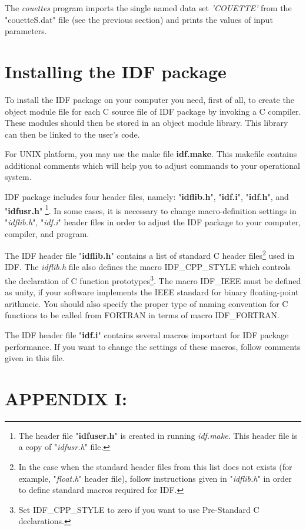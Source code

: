 The {\it couettes} program imports the single named data set
{\it 'COUETTE'} from the "couetteS.dat" file
(see the previous section)
and prints the values of input parameters.

\section{Installing the IDF package}

To install the IDF package on your computer
you need, first of all, 
to create the object module file for each C source file
of IDF package by invoking a C compiler. 
These modules should then be stored in an object module library.
This library can then be linked to the user's code.

For UNIX platform, you may use the make file {\bf idf.make}.
This makefile contains additional comments which will help 
you to adjust commands to your operational system.

IDF package includes four header files, namely:
"{\bf idflib.h}", "{\bf idf.i}", "{\bf idf.h}", 
and "{\bf idfusr.h}" \footnote{
The header file "{\bf idfuser.h}" is created in running {\it idf.make}.
This header file is a copy of "{\it idfusr.h}" file.
}. 
In some cases, it is necessary to change macro-definition settings
in  "{\it idflib.h}", "{\it idf.i}" header files 
in order to adjust the IDF package 
to your computer, compiler, and program.

The IDF header file "{\bf idflib.h}" contains
a list of standard C header files\footnote{
In the case when the standard header files from this list
does not exists (for example, "{\it float.h}" header file),
follow instructions given in "{\it idflib.h}"
in order to define standard macros required for IDF.
} used in IDF.
The {\it idflib.h} file also defines the macro IDF\_CPP\_STYLE
which controls the declaration of C function prototypes\footnote{
Set IDF\_CPP\_STYLE to zero if you want to use 
Pre-Standard C declarations.
}. The macro IDF\_IEEE must be defined as unity, if your
software implements the IEEE standard for binary floating-point arithmeic. 
You should also specify the proper type of naming convention for
C functions to be called from FORTRAN
in terms of macro IDF\_FORTRAN.

The IDF header file "{\bf idf.i}" contains
several macros important for IDF package performance.
If you want to change the settings of these macros,
follow comments given in this file.

\newpage
\section*{APPENDIX I:}
